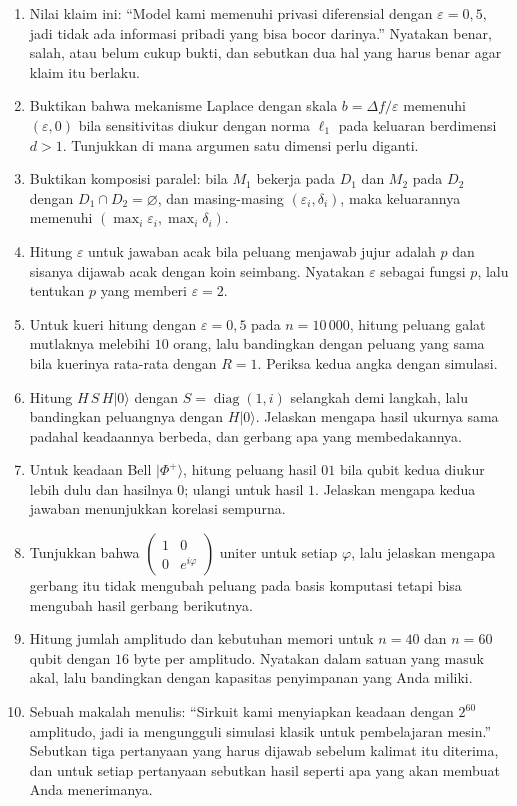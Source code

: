 \begin{latihan}
\begin{enumerate}
  \item Nilai klaim ini: ``Model kami memenuhi privasi diferensial dengan
        $\varepsilon=0{,}5$, jadi tidak ada informasi pribadi yang bisa bocor darinya.''
        Nyatakan benar, salah, atau belum cukup bukti, dan sebutkan dua hal yang harus
        benar agar klaim itu berlaku.
  \item Buktikan bahwa mekanisme Laplace dengan skala $b=\Delta f/\varepsilon$ memenuhi
        $(\varepsilon,0)$ bila sensitivitas diukur dengan norma $\ell_1$ pada keluaran
        berdimensi $d>1$. Tunjukkan di mana argumen satu dimensi perlu diganti.
  \item Buktikan komposisi paralel: bila $M_1$ bekerja pada $D_1$ dan $M_2$ pada $D_2$
        dengan $D_1\cap D_2=\varnothing$, dan masing-masing $(\varepsilon_i,\delta_i)$,
        maka keluarannya memenuhi $(\max_i\varepsilon_i,\max_i\delta_i)$.
  \item Hitung $\varepsilon$ untuk jawaban acak bila peluang menjawab jujur adalah $p$
        dan sisanya dijawab acak dengan koin seimbang. Nyatakan $\varepsilon$ sebagai
        fungsi $p$, lalu tentukan $p$ yang memberi $\varepsilon=2$.
  \item Untuk kueri hitung dengan $\varepsilon=0{,}5$ pada $n=10\,000$, hitung peluang
        galat mutlaknya melebihi $10$ orang, lalu bandingkan dengan peluang yang sama
        bila kuerinya rata-rata dengan $R=1$. Periksa kedua angka dengan simulasi.
  \item Hitung $H\,S\,H|0\rangle$ dengan $S=\operatorname{diag}(1,i)$ selangkah demi
        langkah, lalu bandingkan peluangnya dengan $H|0\rangle$. Jelaskan mengapa hasil
        ukurnya sama padahal keadaannya berbeda, dan gerbang apa yang membedakannya.
  \item Untuk keadaan Bell $|\Phi^{+}\rangle$, hitung peluang hasil $01$ bila qubit
        kedua diukur lebih dulu dan hasilnya $0$; ulangi untuk hasil $1$. Jelaskan
        mengapa kedua jawaban menunjukkan korelasi sempurna.
  \item Tunjukkan bahwa $\begin{pmatrix}1&0\\0&e^{i\varphi}\end{pmatrix}$ uniter untuk
        setiap $\varphi$, lalu jelaskan mengapa gerbang itu tidak mengubah peluang pada
        basis komputasi tetapi bisa mengubah hasil gerbang berikutnya.
  \item Hitung jumlah amplitudo dan kebutuhan memori untuk $n=40$ dan $n=60$ qubit
        dengan $16$ byte per amplitudo. Nyatakan dalam satuan yang masuk akal, lalu
        bandingkan dengan kapasitas penyimpanan yang Anda miliki.
  \item Sebuah makalah menulis: ``Sirkuit kami menyiapkan keadaan dengan $2^{60}$
        amplitudo, jadi ia mengungguli simulasi klasik untuk pembelajaran mesin.''
        Sebutkan tiga pertanyaan yang harus dijawab sebelum kalimat itu diterima, dan
        untuk setiap pertanyaan sebutkan hasil seperti apa yang akan membuat Anda
        menerimanya.
\end{enumerate}


\end{latihan}
